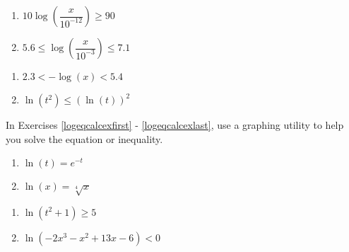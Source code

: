 \begin{multicols}{2}
\begin{enumerate}
\setcounter{enumi}{\value{HW}}

\item $10\log\left(\dfrac{x}{10^{-12}}\right) \geq 90$ \label{sixfourdecibelineq} 
\item $5.6 \leq \log\left(\dfrac{x}{10^{-3}}\right) \leq 7.1$ \label{sixfourRichterineq}


\setcounter{HW}{\value{enumi}}
\end{enumerate}
\end{multicols}

\begin{multicols}{2}
\begin{enumerate}
\setcounter{enumi}{\value{HW}}


\item $2.3 < -\log(x) < 5.4$ \label{sixfourpHineq} 

\item $\ln(t^{2}) \leq (\ln(t))^{2}$ \label{solvelogineqexlast} 

\setcounter{HW}{\value{enumi}}
\end{enumerate}
\end{multicols}

\pagebreak

In Exercises \ref{logeqcalcexfirst} - \ref{logeqcalcexlast}, use a graphing utility to help you solve the equation or  inequality.

\begin{multicols}{2}
\begin{enumerate}
\setcounter{enumi}{\value{HW}}

\item $\ln(t) = e^{-t}$ \label{logeqcalcexfirst} 
\item $\ln(x) = \sqrt[4]{x}$ 

\setcounter{HW}{\value{enumi}}
\end{enumerate}
\end{multicols}

\begin{multicols}{2}
\begin{enumerate}
\setcounter{enumi}{\value{HW}}

\item $\ln(t^{2} + 1) \geq 5$
\item $\ln(-2x^{3} - x^{2} + 13x - 6) < 0$ \label{logeqcalcexlast} 

\setcounter{HW}{\value{enumi}}
\end{enumerate}
\end{multicols}


